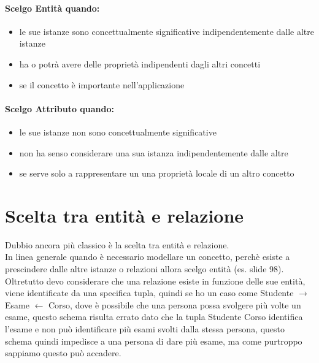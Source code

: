 \paragraph*{Scelgo Entità quando:}
\begin{itemize}
    \item le sue istanze sono concettualmente significative indipendentemente dalle altre istanze
    \item ha o potrà avere delle proprietà indipendenti dagli altri concetti
    \item se il concetto è importante nell'applicazione
\end{itemize}
\paragraph*{Scelgo Attributo quando:}
\begin{itemize}
    \item le sue istanze non sono concettualmente significative
    \item non ha senso considerare una sua istanza indipendentemente dalle altre
    \item se serve solo a rappresentare un una proprietà locale di un altro concetto
\end{itemize}
\section{Scelta tra entità e relazione}
Dubbio ancora più classico è la scelta tra entità e relazione.
\\ In linea generale quando è necessario modellare un concetto, perchè esiste
a prescindere dalle altre istanze o relazioni allora scelgo entità (es. slide 98).
Oltretutto devo considerare che una relazione esiste in funzione delle sue entità,
viene identificate da una specifica tupla, quindi se ho un caso 
come Studente $\rightarrow$ Esame $\leftarrow$ Corso, dove è possibile che una
persona possa svolgere più volte un esame, questo schema risulta errato dato
che la tupla Studente Corso identifica l'esame e non può identificare più esami svolti 
dalla stessa persona, questo schema quindi impedisce a una persona di dare più esame,
ma come purtroppo sappiamo questo può accadere.

